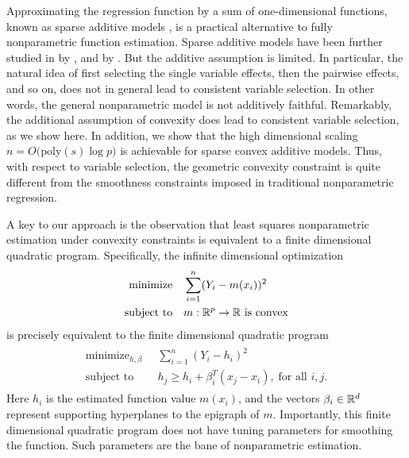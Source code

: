 Approximating the regression function by a sum of one-dimensional
functions, known as sparse additive models \citep{Ravikumar:09}, is a
practical alternative to fully nonparametric function estimation.  
Sparse additive models have been further studied in by \cite{Meier09},
and by \cite{Raskutti:12}.  But 
the additive assumption is limited.  In particular, the natural idea
of first selecting the single variable effects, then the pairwise
effects, and so on, does not in general lead to consistent variable
selection.  In other words, the general nonparametric model is not
additively faithful.  Remarkably, the additional assumption of
convexity does lead to consistent variable selection, as we show
here. In addition, we show that the high dimensional scaling $n =
O\big(\textrm{poly}(s) \log p\big)$ is achievable for sparse convex
additive models. Thus, with respect to variable selection, the
geometric convexity constraint is quite different from the smoothness
constraints imposed in traditional nonparametric regression.

A key to our approach is the observation that least squares
nonparametric estimation under convexity constraints is equivalent to
a finite dimensional quadratic program.  Specifically, the infinite
dimensional optimization 
\begin{align}
\begin{split}
\text{minimize} & \quad \sum_{i=1}^n (Y_i - m(x_i))^2 \\
\text{subject to} &  \quad m:{\mathbb R}^p\rightarrow{\mathbb R}\ \text{is
  convex}
\end{split}
\end{align}
is precisely equivalent to the finite dimensional quadratic
program 
\begin{align}
\begin{split}
\label{eq:outer}
\text{minimize}_{h, \beta} & \;\; \sum_{i=1}^n (Y_i - h_i)^2 \\
\text{subject to} & \;\; h_j \geq h_i + \beta_i^T (x_j-x_i),\; \text{for
    all $i,j$}.
\end{split}
\end{align}
Here $h_i$ is the estimated function value $m(x_i)$, and the vectors
$\beta_i \in {\mathbb R}^d$ represent supporting hyperplanes to the
epigraph of $m$.  Importantly, this finite dimensional quadratic program does
not have tuning parameters for smoothing the function. Such parameters are the bane
of nonparametric estimation.

